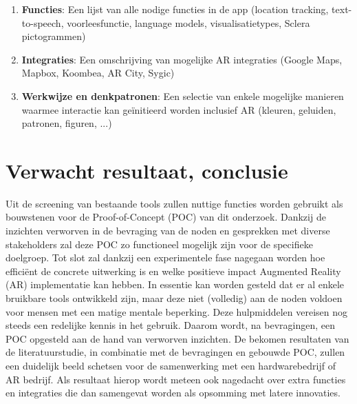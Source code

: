 \begin{enumerate}
    \item \textbf{Functies}: Een lijst van alle nodige functies in de app (location tracking, text-to-speech, voorleesfunctie, language models, visualisatietypes, Sclera pictogrammen)
    \item \textbf{Integraties}: Een omschrijving van mogelijke AR integraties (Google Maps, Mapbox, Koombea, AR City, Sygic)
    \item \textbf{Werkwijze en denkpatronen}: Een selectie van enkele mogelijke manieren waarmee interactie kan geïnitieerd worden inclusief AR (kleuren, geluiden, patronen, figuren, ...)
\end{enumerate}


\section{Verwacht resultaat, conclusie}%
\label{sec:verwachte_resultaten}

Uit de screening van bestaande tools zullen nuttige functies worden gebruikt als bouwstenen voor de Proof-of-Concept (POC) van dit onderzoek. 
Dankzij de inzichten verworven in de bevraging van de noden en gesprekken met diverse stakeholders zal deze POC zo functioneel mogelijk zijn voor de specifieke doelgroep. 
Tot slot zal dankzij een experimentele fase nagegaan worden hoe efficiënt de concrete uitwerking is en welke positieve impact Augmented Reality (AR) implementatie kan hebben.
In essentie kan worden gesteld dat er al enkele bruikbare tools ontwikkeld zijn, maar deze niet (volledig) aan de noden voldoen voor mensen met een matige mentale beperking. Deze hulpmiddelen vereisen nog steeds een redelijke kennis in het gebruik. Daarom wordt, na bevragingen, een POC opgesteld aan de hand van verworven inzichten. De bekomen resultaten van de literatuurstudie, in combinatie met de bevragingen en gebouwde POC, zullen een duidelijk beeld schetsen voor de samenwerking met een hardwarebedrijf of AR bedrijf. 
Als resultaat hierop wordt meteen ook nagedacht over extra functies en integraties die dan samengevat worden als opsomming met latere innovaties.

